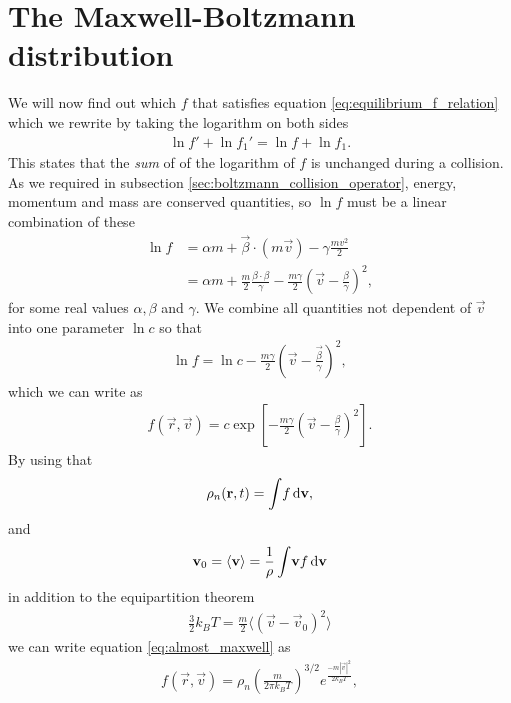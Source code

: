 \section{The Maxwell-Boltzmann distribution}
\label{sec:maxwell_boltzmann_distribution}
We will now find out which $f$ that satisfies equation \eqref{eq:equilibrium_f_relation} which we rewrite by taking the logarithm on both sides
\begin{align}
	\ln f' + \ln f_1' = \ln f + \ln f_1.
\end{align}
This states that the \textit{sum} of of the logarithm of $f$ is unchanged during a collision. As we required in subsection \ref{sec:boltzmann_collision_operator}, energy, momentum and mass are conserved quantities, so $\ln f$ must be a linear combination of these
\begin{align}
	\ln f &= \alpha m + \vec \beta\cdot(m\vec v) - \gamma\frac{mv^2}{2}\\
	&= \alpha m + \frac{m}{2}\frac{\beta\cdot\beta}{\gamma} - \frac{m\gamma}{2}\left(\vec v - \frac{\beta}{\gamma}\right)^2,
\end{align}
for some real values $\alpha, \beta$ and $\gamma$. We combine all quantities not dependent of $\vec v$ into one parameter $\ln c$ so that
\begin{align}
	\ln f = \ln c - \frac{m\gamma}{2}\left(\vec v - \frac{\vec \beta}{\gamma}\right)^2,
\end{align}
which we can write as
\begin{align}
	\label{eq:almost_maxwell}
	f(\vec r, \vec v) = c\exp\left[-\frac{m\gamma}{2}\left(\vec v - \frac{\beta}{\gamma}\right)^2\right].
\end{align}
By using that 
\begin{align}
	\rho_n(\mathbf r, t) = \int\!f \,\mathrm{d}\mathbf v,
\end{align}
and 
\begin{align}
	\mathbf v_0 = \langle \mathbf v\rangle = \frac{1}{\rho}\int\!\mathbf v f\,\mathrm{d}\mathbf v
\end{align}
in addition to the equipartition theorem
\begin{align}
	\frac{3}{2}k_B T = \frac{m}{2}\langle(\vec v - \vec v_0)^2\rangle
\end{align}
we can write equation \eqref{eq:almost_maxwell} as \cite{mclennan1989introduction}
\begin{align}
	\label{eq:maxwell_boltzmann_distribution}
	f(\vec r, \vec v) = \rho_n \left(\frac{m}{2\pi k_B T}\right)^{3/2}e^\frac{-m|\vec v|^2}{2k_BT},
\end{align}
